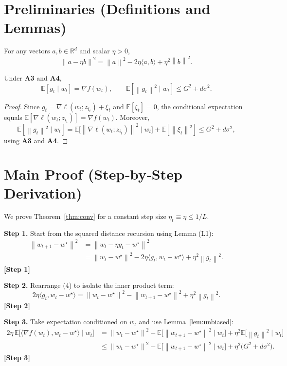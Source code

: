 \documentclass{article}
\newcommand{\E}{\mathbb{E}}
\newcommand{\R}{\mathbb{R}}
\newcommand{\norm}[1]{\left\|#1\right\|}
\newcommand{\ip}[2]{\langle #1,#2\rangle}
\newcommand{\step}[1]{\textbf{[Step #1]}}
\begin{document}
\newpage
\section*{Preliminaries (Definitions and Lemmas)}
\begin{definition}
For any vectors $a,b\in\R^{d}$ and scalar $\eta>0$,
\[
\norm{a-\eta b}^{2}= \norm{a}^{2}-2\eta\ip{a}{b}+\eta^{2}\norm{b}^{2}.
\tag{L1}
\]
\end{definition}
\begin{lemma}\label{lem:unbiased}
Under \textbf{A3} and \textbf{A4},
\[
\E[g_t\mid w_t]=\nabla f(w_t),\qquad
\E[\norm{g_t}^{2}\mid w_t]\le G^{2}+d\sigma^{2}.
\tag{L2}
\]
\end{lemma}
\begin{proof}
Since $g_t=\nabla\ell(w_t;z_{i_t})+\xi_t$ and $\E[\xi_t]=0$, the conditional expectation equals $\E[\nabla\ell(w_t;z_{i_t})]=\nabla f(w_t)$. Moreover,
\[
\E[\norm{g_t}^{2}\mid w_t]=\E\big[\norm{\nabla\ell(w_t;z_{i_t})}^{2}\mid w_t\big]
+\E[\norm{\xi_t}^{2}]
\le G^{2}+d\sigma^{2},
\]
using \textbf{A3} and \textbf{A4}. \qedhere
\end{proof}

\newpage
\section*{Main Proof (Step‑by‑Step Derivation)}
We prove Theorem~\ref{thm:conv} for a constant step size $\eta_t\equiv\eta\le 1/L$.

\noindent\textbf{Step 1.} Start from the squared distance recursion using Lemma (L1):
\[
\begin{aligned}
\norm{w_{t+1}-w^{\star}}^{2}
&= \norm{w_t-\eta g_t-w^{\star}}^{2}\\
&= \norm{w_t-w^{\star}}^{2}
-2\eta\ip{g_t}{w_t-w^{\star}}
+\eta^{2}\norm{g_t}^{2}.
\end{aligned}
\tag{4}
\]
\step{1}

\noindent\textbf{Step 2.} Rearrange (4) to isolate the inner product term:
\[
2\eta\ip{g_t}{w_t-w^{\star}}
= \norm{w_t-w^{\star}}^{2}
-\norm{w_{t+1}-w^{\star}}^{2}
+\eta^{2}\norm{g_t}^{2}.
\tag{5}
\]
\step{2}

\noindent\textbf{Step 3.} Take expectation conditioned on $w_t$ and use Lemma~\ref{lem:unbiased}:
\[
\begin{aligned}
2\eta\,\E\!\big[\ip{\nabla f(w_t)}{w_t-w^{\star}}\mid w_t\big]
&= \norm{w_t-w^{\star}}^{2}
-\E\!\big[\norm{w_{t+1}-w^{\star}}^{2}\mid w_t\big]
+\eta^{2}\E\!\big[\norm{g_t}^{2}\mid w_t\big] \\
&\le \norm{w_t-w^{\star}}^{2}
-\E\!\big[\norm{w_{t+1}-w^{\star}}^{2}\mid w_t\big]
+\eta^{2}\big(G^{2}+d\sigma^{2}\big).
\end{aligned}
\tag{6}
\]
\step{3}
\end{document}
